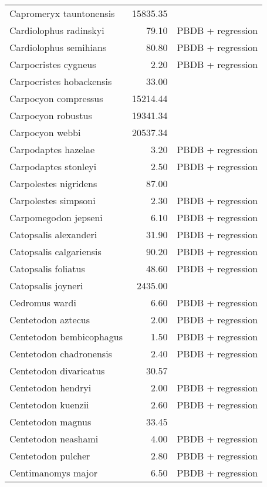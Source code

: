 \begin{table}[ht]
\begin{tabular}{lrl}
  Capromeryx tauntonensis & 15835.35 & \cite{Tomiya2013} \\ 
  Cardiolophus radinskyi & 79.10 & PBDB + regression \\ 
  Cardiolophus semihians & 80.80 & PBDB + regression \\ 
  Carpocristes cygneus & 2.20 & PBDB + regression \\ 
  Carpocristes hobackensis & 33.00 & \cite{Soligo2006} \\ 
  Carpocyon compressus & 15214.44 & \cite{Tomiya2013} \\ 
  Carpocyon robustus & 19341.34 & \cite{Tomiya2013} \\ 
  Carpocyon webbi & 20537.34 & \cite{Tomiya2013} \\ 
  Carpodaptes hazelae & 3.20 & PBDB + regression \\ 
  Carpodaptes stonleyi & 2.50 & PBDB + regression \\ 
  Carpolestes nigridens & 87.00 & \cite{Scott2003a} \\ 
  Carpolestes simpsoni & 2.30 & PBDB + regression \\ 
  Carpomegodon jepseni & 6.10 & PBDB + regression \\ 
  Catopsalis alexanderi & 31.90 & PBDB + regression \\ 
  Catopsalis calgariensis & 90.20 & PBDB + regression \\ 
  Catopsalis foliatus & 48.60 & PBDB + regression \\ 
  Catopsalis joyneri & 2435.00 & \cite{Wilson2012} \\ 
  Cedromus wardi & 6.60 & PBDB + regression \\ 
  Centetodon aztecus & 2.00 & PBDB + regression \\ 
  Centetodon bembicophagus & 1.50 & PBDB + regression \\ 
  Centetodon chadronensis & 2.40 & PBDB + regression \\ 
  Centetodon divaricatus & 30.57 & \cite{Tomiya2013} \\ 
  Centetodon hendryi & 2.00 & PBDB + regression \\ 
  Centetodon kuenzii & 2.60 & PBDB + regression \\ 
  Centetodon magnus & 33.45 & \cite{Tomiya2013} \\ 
  Centetodon neashami & 4.00 & PBDB + regression \\ 
  Centetodon pulcher & 2.80 & PBDB + regression \\ 
  Centimanomys major & 6.50 & PBDB + regression \\ 

\end{tabular}
\end{table}
